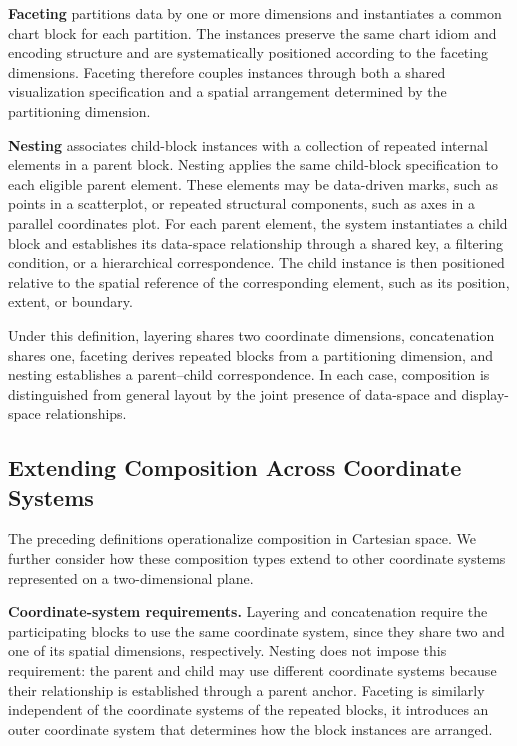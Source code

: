 \textbf{Faceting} partitions data by one or more dimensions and instantiates a common
chart block for each partition. The instances preserve the same chart idiom
and encoding structure and are systematically positioned according to the
faceting dimensions. Faceting therefore couples instances through both a
shared visualization specification and a spatial arrangement determined by
the partitioning dimension.

\textbf{Nesting} associates child-block instances with a collection of
repeated internal elements in a parent block. Nesting applies the same child-block specification to each
eligible parent element. These elements may be data-driven marks, such as
points in a scatterplot, or repeated structural components, such as axes in a
parallel coordinates plot. For each parent element, the system instantiates a
child block and establishes its data-space relationship through a shared key,
a filtering condition, or a hierarchical correspondence. The child instance
is then positioned relative to the spatial reference of the corresponding
element, such as its position, extent, or boundary.

Under this definition, layering shares two coordinate dimensions,
concatenation shares one, faceting derives repeated blocks from a partitioning
dimension, and nesting establishes a parent--child correspondence. In each
case, composition is distinguished from general layout by the joint presence
of data-space and display-space relationships.


\subsection{Extending Composition Across Coordinate Systems}

The preceding definitions operationalize composition in Cartesian space. We
further consider how these composition types extend to other coordinate
systems represented on a two-dimensional plane. 

\textbf{Coordinate-system requirements.}
Layering and concatenation require the participating blocks to use the same
coordinate system, since they share two and one of its spatial dimensions,
respectively. Nesting does not impose this requirement: the parent and child
may use different coordinate systems because their relationship is
established through a parent anchor. Faceting is similarly independent of the
coordinate systems of the repeated blocks, it introduces an
outer coordinate system that determines how the block instances are arranged.

